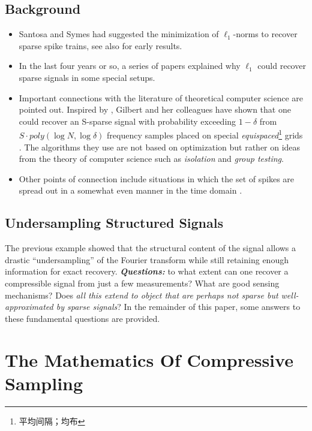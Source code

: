 \subsection{Background}
\begin{itemize}
	\item Santosa and Symes \cite{Santosa1986} had suggested the minimization of $\ell_1$-norms to recover sparse spike trains, see also \cite{14,2-22} for early results.
	\item In the last four years or so, a series of papers \cite{Donoho2001,2-27,2-28,2-29,2-33,2-30}  explained why $\ell_1$ could recover sparse signals in some special setups. 
	\item Important connections with the literature of theoretical computer science are pointed out. Inspired by \cite{2-37}, Gilbert and her colleagues have shown that one could recover an S-sparse signal with probability exceeding $1-\delta$ from $S \cdot poly(\log N,\log \delta)$ frequency samples placed on special \emph{equispaced}\footnote{平均间隔；均布} grids \cite{13}. The algorithms they use are not based on optimization but rather on ideas from the theory of computer science such as \emph{isolation} and \emph{group testing}.
	\item Other points of connection include situations in which the set of spikes are spread out in a somewhat even manner in the time domain \cite{2-22,12}.
\end{itemize}
\subsection{Undersampling Structured Signals}
The previous example showed that the structural content of the signal allows a drastic “undersampling” of the Fourier transform while still retaining enough information for exact recovery. \textbf{\emph{Questions:}} to what extent can one recover a compressible signal from just a few measurements? What are good sensing mechanisms? Does \textcolor[rgb]{1,0,0}{\emph{all this extend to object that are perhaps not sparse but well-approximated by sparse signals}}? In the remainder of this paper, some answers to these fundamental questions are provided.
\section{The Mathematics Of Compressive Sampling}
